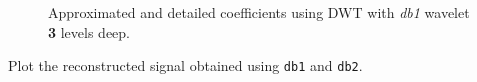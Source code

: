 \begin{figure}[H]
    \centering

    \caption{Approximated and detailed coefficients using DWT with \textit{db1} wavelet \textbf{3} levels deep. }
    \label{fig:Q1a}
\end{figure}





\begin{tcolorbox}[colback=red!5!white,colframe=red!75!black,title=Problem 1.b]
    Plot the reconstructed signal obtained using \verb|db1| and \verb|db2|.
\end{tcolorbox}

